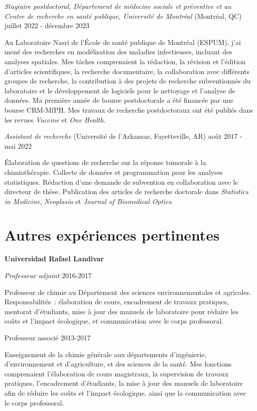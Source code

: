 \documentclass[10pt,]{article}
\providecommand{\tightlist}{%
  \setlength{\itemsep}{0pt}\setlength{\parskip}{0pt}}
\renewenvironment{itemize}{
  \begin{list}{}{
    \setlength{\leftmargin}{1.5em}
  }
}{
  \end{list}
}
\begin{document}
\emph{Stagiaire postdoctoral, Département de médecine sociale et
préventive et au Centre de recherche en santé publique, Université de
Montréal} (Montréal, QC) \hfill juillet 2022 - décembre 2023

Au Laboratoire Nasri de l'École de santé publique de Montréal (ESPUM),
j'ai mené des recherches en modélisation des maladies infectieuses,
incluant des analyses spatiales. Mes tâches comprenaient la rédaction,
la révision et l'édition d'articles scientifiques, la recherche
documentaire, la collaboration avec différents groupes de recherche, la
contribution à des projets de recherche subventionnés du laboratoire et
le développement de logiciels pour le nettoyage et l'analyse de données.
Ma première année de bourse postdoctorale a été financée par une bourse
CRM-MfPH. Mes travaux de recherche postdoctoraux ont été publiés dans
les revues \emph{Vaccine} et \emph{One Health}.

\emph{Assistant de recherche} (Université de l'Arkansas, Fayetteville,
AR) \hfill août 2017 - mai 2022

Élaboration de questions de recherche sur la réponse tumorale à la
chimiothérapie. Collecte de données et programmation pour les analyses
statistiques. Rédaction d'une demande de subvention en collaboration
avec le directeur de thèse. Publication des articles de recherche
doctorale dans \emph{Statistics in Medicine}, \emph{Neoplasia} et
\emph{Journal of Biomedical Optics}.

\section{Autres expériences
pertinentes}\label{autres-expuxe9riences-pertinentes}

\textbf{Universidad Rafael Landivar}

\emph{Professeur adjoint} \hfill 2016-2017

\begin{itemize}
\tightlist
\item
  Professeur de chimie au Département des sciences environnementales et
  agricoles. Responsabilités~: élaboration de cours, encadrement de
  travaux pratiques, mentorat d'étudiants, mise à jour des manuels de
  laboratoire pour réduire les coûts et l'impact écologique, et
  communication avec le corps professoral.
\end{itemize}

Professeur associé \hfill 2013-2017

\begin{itemize}
\tightlist
\item
  Enseignement de la chimie générale aux départements d'ingénierie,
  d'environnement et d'agriculture, et des sciences de la santé. Mes
  fonctions comprenaient l'élaboration de cours magistraux, la
  supervision de travaux pratiques, l'encadrement d'étudiants, la mise à
  jour des manuels de laboratoire afin de réduire les coûts et l'impact
  écologique, ainsi que la communication avec le corps professoral.
\end{itemize}
\end{document}
